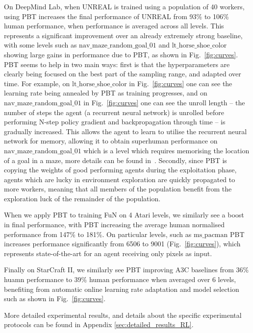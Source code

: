 \documentclass{article} %
\newcommand{\figref}[1]{Fig.~\ref{#1}}
\begin{document}
On DeepMind Lab, when UNREAL is trained using a population of 40 workers, using PBT increases the final performance of UNREAL from 93\% to 106\% human performance, when performance is averaged across all levels. This represents a significant improvement over an already extremely strong baseline, with some levels such as $\mathrm{nav\_maze\_random\_goal\_01}$ and $\mathrm{lt\_horse\_shoe\_color}$ showing large gains in performance due to PBT, as shown in \figref{fig:curves}. PBT seems to help in two main ways: first is that the hyperparameters are clearly being focused on the best part of the sampling range, and adapted over time. For example, on $\mathrm{lt\_horse\_shoe\_color}$ in \figref{fig:curves} one can see the learning rate being annealed by PBT as training progresses, and on $\mathrm{nav\_maze\_random\_goal\_01}$ in \figref{fig:curves} one can see the unroll length -- the number of steps the agent (a recurrent neural network) is unrolled before performing N-step policy gradient and backpropagation through time -- is gradually increased. This allows the agent to learn to utilise the recurrent neural network for memory, allowing it to obtain superhuman performance on $\mathrm{nav\_maze\_random\_goal\_01}$ which is a level which requires memorising the location of a goal in a maze, more details can be found in~\citep{jaderberg2016reinforcement}. Secondly, since PBT is copying the weights of good performing agents during the exploitation phase, agents which are lucky in environment exploration are quickly propagated to more workers, meaning that all members of the population benefit from the exploration luck of the remainder of the population.

When we apply PBT to training FuN on 4 Atari levels, we similarly see a boost in final performance, with PBT increasing the average human normalised performance from 147\% to 181\%. On particular levels, such as $\mathrm{ms\_pacman}$ PBT increases performance significantly from 6506 to 9001 (\figref{fig:curves}), which represents state-of-the-art for an agent receiving only pixels as input. 

Finally on StarCraft II, we similarly see PBT improving A3C baselines from 36\% huamn performance to 39\% human performance when averaged over 6 levels, benefiting from automatic online learning rate adaptation and model selection such as shown in \figref{fig:curves}.

More detailed experimental results, and details about the specific experimental protocols can be found in Appendix \ref{sec:detailed_results_RL}.
\end{document}
